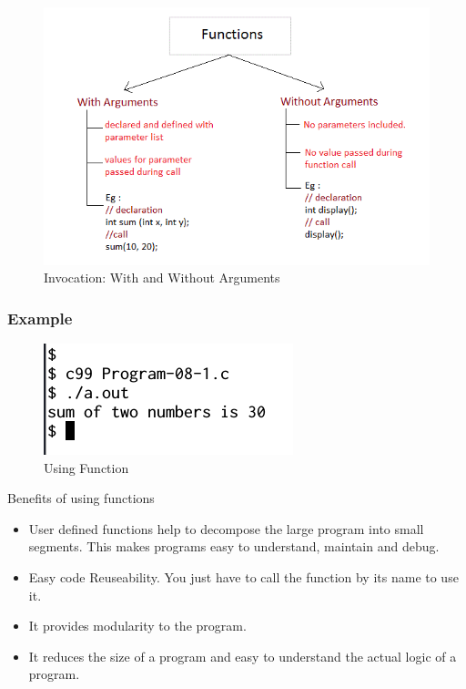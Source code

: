 \documentclass[11pt,a4paper]{article}
\begin{document}
\begin{figure}[ht]

\begin{center}
\includegraphics[scale = 0.5]{functions-and-arguments.png}
\caption{Invocation: With and Without Arguments}
\label{Invocation}
\end{center}
\end{figure}

\subsubsection*{Example} 


\begin{figure}[ht]
\label{output-08-1}
\begin{center}
\includegraphics[scale=0.6]{Output-08-1.png}
\caption{Using Function}
\end{center}
\end{figure}

\begin{bclogo}[couleur=blue!5, arrondi=0.3, logo=\bctrombone]{Benefits of using functions}
\begin{itemize}
\item User defined functions help to decompose the large program into small segments. This makes programs easy to understand, maintain and debug.
\item Easy code Reuseability. You just have to call the function by its name to use it.
\item It provides modularity to the program.
\item It reduces the size of a program and easy to understand the actual logic of a program.
\end{itemize}
\end{bclogo}
\end{document}
